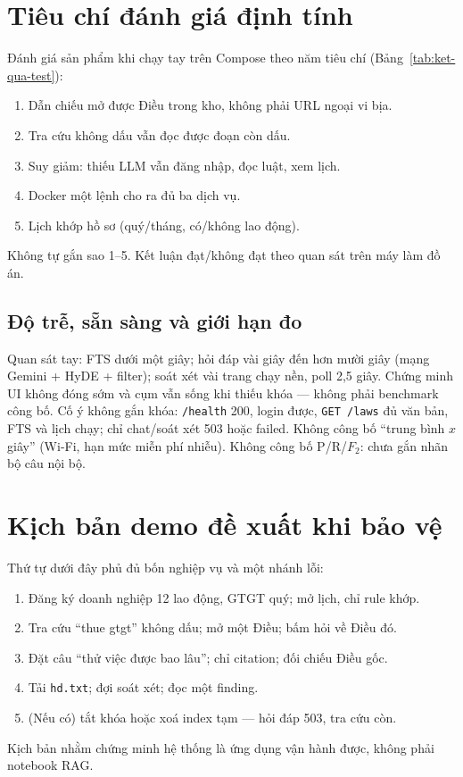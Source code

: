 \section{Tiêu chí đánh giá định tính}

Đánh giá sản phẩm khi chạy tay trên Compose theo năm tiêu chí (Bảng~\ref{tab:ket-qua-test}):

\begin{enumerate}
    \item Dẫn chiếu mở được Điều trong kho, không phải URL ngoại vi bịa.
    \item Tra cứu không dấu vẫn đọc được đoạn còn dấu.
    \item Suy giảm: thiếu LLM vẫn đăng nhập, đọc luật, xem lịch.
    \item Docker một lệnh cho ra đủ ba dịch vụ.
    \item Lịch khớp hồ sơ (quý/tháng, có/không lao động).
\end{enumerate}

Không tự gắn sao 1--5. Kết luận đạt/không đạt theo quan sát trên máy làm đồ án.

\subsection{Độ trễ, sẵn sàng và giới hạn đo}

\boncau
{Quan sát tay: FTS dưới một giây; hỏi đáp vài giây đến hơn mười giây (mạng
Gemini + HyDE + filter); soát xét vài trang chạy nền, poll 2,5 giây.}
{Chứng minh UI không đóng sớm và cụm vẫn sống khi thiếu khóa --- không phải
benchmark công bố.}
{Cố ý không gắn khóa: \texttt{/health} 200, login được, \texttt{GET /laws} đủ
\soLuat{} văn bản, FTS và lịch chạy; chỉ chat/soát xét 503 hoặc failed.}
{Không công bố ``trung bình $x$ giây'' (Wi-Fi, hạn mức miễn phí nhiễu). Không
công bố P/R/$F_2$: chưa gắn nhãn bộ câu nội bộ.}

\section{Kịch bản demo đề xuất khi bảo vệ}

Thứ tự dưới đây phủ đủ bốn nghiệp vụ và một nhánh lỗi:

\begin{enumerate}
    \item Đăng ký doanh nghiệp 12 lao động, GTGT quý; mở lịch, chỉ rule khớp.
    \item Tra cứu ``thue gtgt'' không dấu; mở một Điều; bấm hỏi về Điều đó.
    \item Đặt câu ``thử việc được bao lâu''; chỉ citation; đối chiếu Điều gốc.
    \item Tải \texttt{hd.txt}; đợi soát xét; đọc một finding.
    \item (Nếu có) tắt khóa hoặc xoá index tạm --- hỏi đáp 503, tra cứu còn.
\end{enumerate}

Kịch bản nhằm chứng minh hệ thống là ứng dụng vận hành được, không phải notebook RAG.
